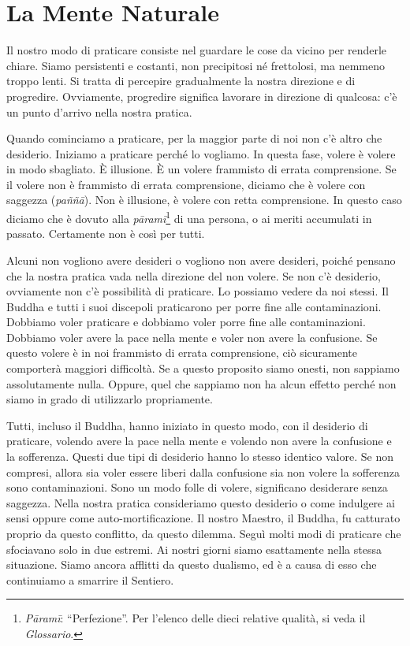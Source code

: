 \chapter{La Mente Naturale}

Il nostro modo di praticare consiste nel guardare le cose da vicino per
renderle chiare. Siamo persistenti e costanti, non precipitosi né
frettolosi, ma nemmeno troppo lenti. Si tratta di percepire gradualmente
la nostra direzione e di progredire. Ovviamente, progredire significa
lavorare in direzione di qualcosa: c'è un punto d'arrivo nella nostra
pratica.

Quando cominciamo a praticare, per la maggior parte di noi non c'è altro
che desiderio. Iniziamo a praticare perché lo vogliamo. In questa fase,
volere è volere in modo sbagliato. È illusione. È un volere frammisto di
errata comprensione. Se il volere non è frammisto di errata
comprensione, diciamo che è volere con saggezza (\emph{paññā}). Non è
illusione, è volere con retta comprensione. In questo caso diciamo che è
dovuto alla \emph{pāramī}\footnote{\emph{Pāramī}: ``Perfezione''. Per
  l'elenco delle dieci relative qualità, si veda il \emph{Glossario}.}
di una persona, o ai meriti accumulati in passato. Certamente non è così
per tutti.

Alcuni non vogliono avere desideri o vogliono non avere desideri, poiché
pensano che la nostra pratica vada nella direzione del non volere. Se
non c'è desiderio, ovviamente non c'è possibilità di praticare. Lo
possiamo vedere da noi stessi. Il Buddha e tutti i suoi discepoli
praticarono per porre fine alle contaminazioni. Dobbiamo voler praticare
e dobbiamo voler porre fine alle contaminazioni. Dobbiamo voler avere la
pace nella mente e voler non avere la confusione. Se questo volere è in
noi frammisto di errata comprensione, ciò sicuramente comporterà
maggiori difficoltà. Se a questo proposito siamo onesti, non sappiamo
assolutamente nulla. Oppure, quel che sappiamo non ha alcun effetto
perché non siamo in grado di utilizzarlo propriamente.

Tutti, incluso il Buddha, hanno iniziato in questo modo, con il
desiderio di praticare, volendo avere la pace nella mente e volendo non
avere la confusione e la sofferenza. Questi due tipi di desiderio hanno
lo stesso identico valore. Se non compresi, allora sia voler essere
liberi dalla confusione sia non volere la sofferenza sono
contaminazioni. Sono un modo folle di volere, significano desiderare
senza saggezza. Nella nostra pratica consideriamo questo desiderio o
come indulgere ai sensi oppure come auto-mortificazione. Il nostro
Maestro, il Buddha, fu catturato proprio da questo conflitto, da questo
dilemma. Seguì molti modi di praticare che sfociavano solo in due
estremi. Ai nostri giorni siamo esattamente nella stessa situazione.
Siamo ancora afflitti da questo dualismo, ed è a causa di esso che
continuiamo a smarrire il Sentiero.

